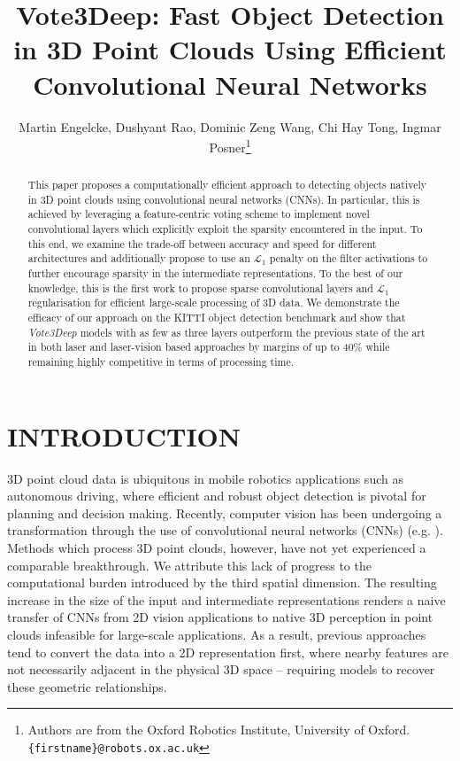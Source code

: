 \documentclass[letterpaper, 10 pt, conference]{tex_style/ieeeconf}
\title{\LARGE \bf
Vote3Deep: Fast Object Detection in 3D Point Clouds Using Efficient Convolutional Neural Networks
}
\author{Martin Engelcke, Dushyant Rao, Dominic Zeng Wang, Chi Hay Tong, Ingmar Posner\thanks{Authors are from the Oxford Robotics Institute, University of Oxford.
\texttt{\{firstname\}@robots.ox.ac.uk}}}
\begin{document}
\maketitle
\thispagestyle{empty}
\pagestyle{empty}


\begin{abstract}

This paper proposes a computationally efficient approach to detecting objects natively in 3D point clouds using convolutional neural networks (CNNs).
In particular, this is achieved by leveraging a feature-centric voting scheme to implement novel convolutional layers which explicitly exploit the sparsity encountered in the input.
To this end, we examine the trade-off between accuracy and speed for different architectures and additionally propose to use an $\mathcal{L}_1$ penalty on the filter activations to further encourage sparsity in the intermediate representations.
To the best of our knowledge, this is the first work to propose sparse convolutional layers and $\mathcal{L}_1$ regularisation for efficient large-scale processing of 3D data.
We demonstrate the efficacy of our approach on the KITTI object detection benchmark and show that \emph{Vote3Deep} models with as few as three layers outperform the previous state of the art in both laser and laser-vision based approaches by margins of up to 40\% while remaining highly competitive in terms of processing time. 
\end{abstract}



\section{INTRODUCTION}
3D point cloud data is ubiquitous in mobile robotics applications such as autonomous driving, where efficient and robust object detection is pivotal for planning and decision making. Recently, computer vision has been undergoing a transformation through the use of convolutional neural networks (CNNs) (e.g. \cite{krizhevsky2012imagenet, simonyan2014very, szegedy2015going, he2015deep}).
Methods which process 3D point clouds, however, have not yet experienced a comparable breakthrough.
We attribute this lack of progress to the computational burden introduced by the third spatial dimension.
The resulting increase in the size of the input and intermediate representations renders a naive transfer of CNNs from 2D vision applications to native 3D perception in point clouds infeasible for large-scale applications.
As a result, previous approaches tend to convert the data into a 2D representation first, where nearby features are not necessarily adjacent in the physical 3D space -- requiring models to recover these geometric relationships.
\end{document}
